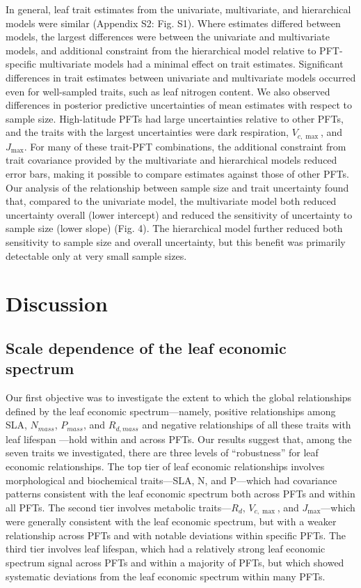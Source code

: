 \documentclass{article}
\begin{document}
In general, leaf trait estimates from the univariate, multivariate, and hierarchical models were similar (Appendix S2: Fig. S1).
Where estimates differed between models, the largest differences were between the univariate and multivariate models, and additional constraint from the hierarchical model relative to PFT-specific multivariate models had a minimal effect on trait estimates.
Significant differences in trait estimates between univariate and multivariate models occurred even for well-sampled traits, such as leaf nitrogen content.
We also observed differences in posterior predictive uncertainties of mean estimates with respect to sample size.
High-latitude PFTs had large uncertainties relative to other PFTs, and the traits with the largest uncertainties were dark respiration, $V_{c,\max}$, and $J_{\max}$.
For many of these trait-PFT combinations, the additional constraint from trait covariance provided by the multivariate and hierarchical models reduced error bars, making it possible to compare estimates against those of other PFTs.
Our analysis of the relationship between sample size and trait uncertainty found that, compared to the univariate model, the multivariate model both reduced uncertainty overall (lower intercept) and reduced the sensitivity of uncertainty to sample size (lower slope) (Fig. 4).
The hierarchical model further reduced both sensitivity to sample size and overall uncertainty, but this benefit was primarily detectable only at very small sample sizes.


\section{Discussion}

\subsection{Scale dependence of the leaf economic spectrum}

Our first objective was to investigate the extent to which the global relationships defined by the leaf economic spectrum---namely, positive relationships among SLA, $N_{mass}$, $P_{mass}$, and $R_{d,mass}$ and negative relationships of all these traits with leaf lifespan \citep{wright_2004_worldwide,shipley_2006_fundamental,reich_2014_world,diaz_2015_global} ---hold within and across PFTs.
Our results suggest that, among the seven traits we investigated, there are three levels of ``robustness'' for leaf economic relationships.
The top tier of leaf economic relationships involves morphological and biochemical traits---SLA, N, and P---which had covariance patterns consistent with the leaf economic spectrum both across PFTs and within all PFTs.
The second tier involves metabolic traits---$R_d$, $V_{c,\max}$, and $J_{\max}$---which were generally consistent with the leaf economic spectrum, but with a weaker relationship across PFTs and with notable deviations within specific PFTs.
The third tier involves leaf lifespan, which had a relatively strong leaf economic spectrum signal across PFTs and within a majority of PFTs,
but which showed systematic deviations from the leaf economic spectrum within many PFTs.
\end{document}
